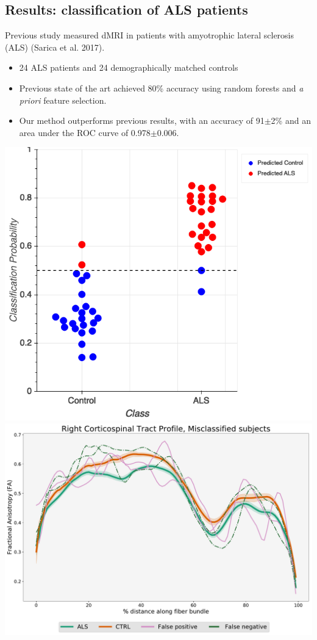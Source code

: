 \documentclass[a0, landscape]{a0poster}
\newenvironment{Figure}
  {\par\medskip\noindent\minipage{\linewidth}}
  {\endminipage\par\medskip}
\begin{document}
\begin{multicols}{3}
\vspace{-1.25em}
\section*{Results: classification of ALS patients}
\noindent Previous study measured dMRI in patients with amyotrophic lateral sclerosis (ALS) (Sarica et al. 2017).
\begin{itemize}
    \item 24 ALS patients and 24 demographically matched controls
    \item Previous state of the art achieved 80\% accuracy using random forests and \emph{a priori} feature selection.
    \item Our method outperforms previous results, with an accuracy of 91$\pm$2\% and an area under the ROC curve of 0.978$\pm$0.006.
\end{itemize}

\begin{Figure}
    \centering
    \includegraphics[width=0.315\linewidth, valign=m]{classification_probs.png}
    \includegraphics[width=0.475\linewidth, valign=m]{classification_subjects_profiles.pdf}
\end{Figure}


\end{multicols}
\end{document}
